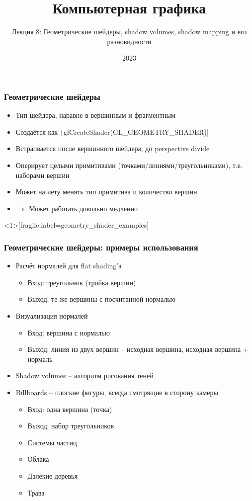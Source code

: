 \documentclass{beamer}
\title{Компьютерная графика}
\subtitle{Лекция 8: Геометрические шейдеры, shadow volumes, shadow mapping и его разновидности}
\date{2023}
\begin{document}

\frame{\titlepage}

\begin{frame}[fragile]
\frametitle{Геометрические шейдеры}
\begin{itemize}
\item Тип шейдера, наравне в вершинным и фрагментным
\pause
\item Создаётся как \texttt|glCreateShader(GL_GEOMETRY_SHADER)|
\pause
\item Встраивается после вершинного шейдера, до perspective divide
\pause
\item Оперирует целыми примитивами (точками/линиями/треугольниками), т.е. наборами вершин
\pause
\item Может на лету менять тип примитива и количество вершин
\pause
\item \begin{math}\Longrightarrow\end{math} Может работать довольно медленно
\end{itemize}
\end{frame}

\begin{frame}<1>[fragile,label=geometry_shader_examples]
\frametitle{Геометрические шейдеры: примеры использования}
\fontsize{10pt}{10pt}
\begin{itemize}
\item Расчёт нормалей для flat shading'а
\pause
\begin{itemize}
\item Вход: треугольник (тройка вершин)
\item Выход: те же вершины с посчитанной нормалью
\end{itemize}
\pause
\item Визуализация нормалей
\pause
\begin{itemize}
\item Вход: вершина с нормалью
\item Выход: линия из двух вершин -- исходная вершина, исходная вершина + нормаль
\end{itemize}
\pause
\item Shadow volumes -- алгоритм рисования теней
\pause
\item Billboards -- плоские фигуры, всегда смотрящие в сторону камеры
\pause
\begin{itemize}
\item Вход: одна вершина (точка)
\item Выход: набор треугольников
\pause
\item Системы частиц
\pause
\item Облака
\pause
\item Далёкие деревья
\pause
\item Трава
\end{itemize}
\end{itemize}
\end{frame}
\end{document}
